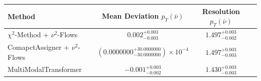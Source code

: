     \begin{tabular}{lccc}
        \toprule
        Method & Mean Deviation $p_{T}(\bar{\nu})$ & Resolution $p_{T}(\bar{\nu})$ \\
        \midrule
        $\chi^2$-Method + $\nu^2$-Flows & $0.002^{+0.003}_{-0.003}$ & $1.497^{+0.003}_{-0.002}$ \\
        ComapctAssigner + $\nu^2$-Flows & $(0.0000000^{+30.0000000}_{-30.0000000})\times 10^{-4}$ & $1.497^{+0.003}_{-0.003}$ \\
        MultiModalTransformer & $-0.001^{+0.003}_{-0.002}$ & $1.430^{+0.003}_{-0.003}$ \\
        \bottomrule
    \end{tabular}